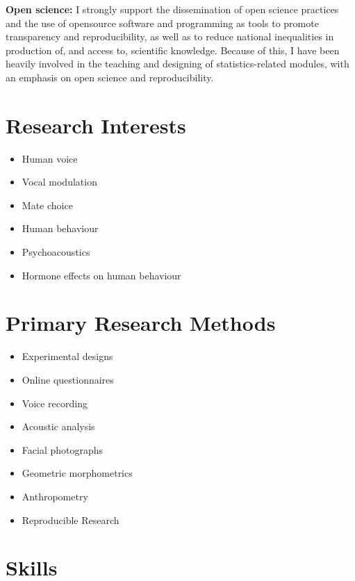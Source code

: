 \documentclass[11pt, a4paper]{awesome-cv}
\begin{document}
\textbf{Open science:} I strongly support the dissemination of open
science practices and the use of opensource software and programming as
tools to promote transparency and reproducibility, as well as to reduce
national inequalities in production of, and access to, scientific
knowledge. Because of this, I have been heavily involved in the teaching
and designing of statistics-related modules, with an emphasis on open
science and reproducibility.

\hypertarget{research-interests}{%
\section{Research Interests}\label{research-interests}}

\begin{multicols}{2}
\begin{itemize}
 \item Human voice
 \item Vocal modulation 
 \item Mate choice
 \item Human behaviour
 \item Psychoacoustics
 \item Hormone effects on human behaviour
\end{itemize}
\end{multicols}

\hypertarget{primary-research-methods}{%
\section{Primary Research Methods}\label{primary-research-methods}}

\begin{multicols}{2}
\begin{itemize}
 \item Experimental designs
 \item Online questionnaires 
 \item Voice recording
 \item Acoustic analysis
 \item Facial photographs
 \item Geometric morphometrics
 \item Anthropometry
 \item Reproducible Research
\end{itemize}
\end{multicols}

\hypertarget{skills}{%
\section{Skills}\label{skills}}
\end{document}
